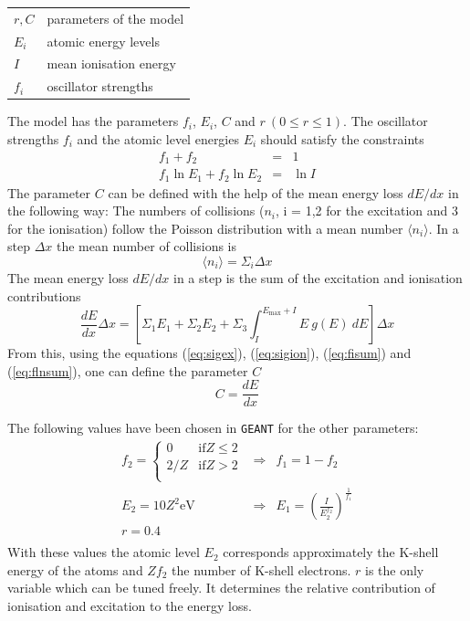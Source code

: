 \documentclass{article}
\let\SetRowColor\relax
\newcommand{\Emax}{\ensuremath{E_{\mathrm{max}}}}
\newcommand{\GEANT}{\texttt{GEANT}}
\begin{document}
\begin{tabular}{ll}
\SetRowColor $r, C$          & parameters of the model \\
\SetRowColor $E_i$           & atomic energy levels \\
\SetRowColor $I$             & mean ionisation energy \\
\SetRowColor ${f_i}$         & oscillator strengths
\end{tabular}

The model has the parameters $f_i$, $E_i$, $C$ and $r ~(0\leq r\leq
1)$.  The oscillator strengths $f_i$ and the atomic level energies
$E_i$ should satisfy the constraints
\begin{eqnarray}
f_1 + f_2 & = & 1  \label{eq:fisum}\\
f_1 \ln E_1 + f_2 \ln E_2 & = & \ln I \label{eq:flnsum}
\end{eqnarray}
The parameter $C$ can be defined with the help of the mean energy loss
$dE/dx$ in the following way: The numbers of collisions ($n_i$, i =
1,2 for the excitation and 3 for the ionisation) follow the Poisson
distribution with a mean number $ \langle n_i \rangle $. In a step
$\Delta x$ the mean number of collisions is
\begin{equation}
\langle n_i \rangle = \Sigma_i \Delta x
\end{equation}
The mean energy loss $dE/dx$ in a step is the sum of the excitation
and ionisation contributions
\begin{equation}
\frac{dE}{dx} \Delta x = \left[ \Sigma_1 E_1 + \Sigma_2 E_2 +
                          \Sigma_3 \int_{I}^{\Emax+I} E~g(E)~dE \right]
                         \Delta x
\end{equation}
From this, using the equations (\ref{eq:sigex}), (\ref{eq:sigion}),
(\ref{eq:fisum}) and (\ref{eq:flnsum}), one can define the parameter
$C$
\begin{equation}
C = \frac{dE}{dx}
\end{equation}

The following values have been chosen in \GEANT{} for the other
parameters:
\[
\begin{array}{lcl}
f_2 = \left\{ \begin{array}{ll}
             0   & \mathrm{if} Z \leq 2 \\
             2/Z & \mathrm{if} Z > 2 \\
             \end{array} \right.    & \Rightarrow & f_1 = 1 - f_2 \\
E_2 = 10 Z^2 \mathrm{eV}  & \Rightarrow & E_1 = \left(\frac{I}{E_{2}^{f_2}}
                                              \right)^{\frac{1}{f_1}} \\
r  = 0.4 & & \\
\end{array}
\]
With these values the atomic level $E_2$ corresponds approximately
the K-shell energy of the atoms and $Zf_2$ the number of K-shell
electrons. $r$ is the only variable which can be tuned freely. It
determines the relative contribution of ionisation and
excitation to the energy loss.
\end{document}
